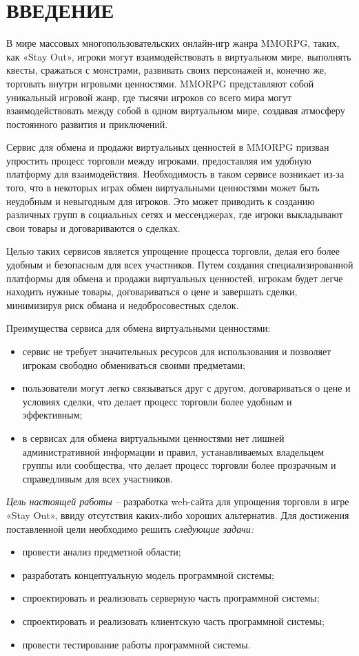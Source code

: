 \section*{ВВЕДЕНИЕ}

В мире массовых многопользовательских онлайн-игр жанра MMORPG, таких, как «Stay Out», игроки могут взаимодействовать в виртуальном мире, выполнять квесты, сражаться с монстрами, развивать своих персонажей и, конечно же, торговать внутри игровыми ценностями. MMORPG представляют собой уникальный игровой жанр, где тысячи игроков со всего мира могут взаимодействовать между собой в одном виртуальном мире, создавая атмосферу постоянного развития и приключений.

Сервис для обмена и продажи виртуальных ценностей в MMORPG
призван упростить процесс торговли между игроками, предоставляя им удобную платформу для взаимодействия. Необходимость в таком сервисе возникает из-за того, что в некоторых играх обмен виртуальными ценностями может быть неудобным и невыгодным для игроков. Это может приводить к созданию различных групп в социальных сетях и мессенджерах, где игроки
выкладывают свои товары и договариваются о сделках.

Целью таких сервисов является упрощение процесса торговли, делая
его более удобным и безопасным для всех участников. Путем создания специализированной платформы для обмена и продажи виртуальных ценностей, игрокам будет легче находить нужные товары, договариваться о цене и завершать сделки, минимизируя риск обмана и недобросовестных сделок.

Преимущества сервиса для обмена виртуальными ценностями:
\begin{itemize}
	\item сервис не требует значительных ресурсов для использования и позволяет игрокам свободно обмениваться своими предметами;
	\item пользователи могут легко связываться друг с другом, договариваться о цене и условиях сделки, что делает процесс торговли более удобным и эффективным;
	\item  в сервисах для обмена виртуальными ценностями нет лишней административной информации и правил, устанавливаемых владельцем группы или сообщества, что делает процесс торговли более прозрачным и справедливым для всех участников.
\end{itemize}

\emph{Цель настоящей работы} – разработка web-сайта для упрощения торговли в игре «Stay Out», ввиду отсутствия каких-либо хороших альтернатив. Для достижения поставленной цели необходимо решить \emph{следующие задачи:}
\begin{itemize}
	\item провести анализ предметной области;
	\item разработать концептуальную модель программной системы;
	\item спроектировать и реализовать серверную часть программной системы;
	\item спроектировать и реализовать клиентскую часть программной системы;
	\item провести тестирование работы программной системы.
\end{itemize}

